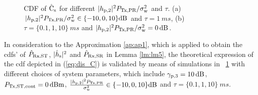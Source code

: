 \begin{figure}[!ht]
{\label{fig:CDF_C1_s}}
\hfil
{}
\vspace{0.3cm}
\caption{CDF of $\hat{\text{{C}}}_{\text{s}}$ for different $|h_{\text{p,2}}|^2 P_{\text{Tx,PR}}/\sigma^2_{\text{w}}$ and $\tau$. (a) $|h_{\text{p,2}}|^2 P_{\text{Tx,PR}}/\sigma^2_{\text{w}} \in \{-10, 0, 10\} \SI{}{dB}$ and $\tau = \SI{1}{ms}$, (b) $\tau = \{0.1, 1, 10\} \SI{}{ms}$ and $|h_{\text{p,2}}|^2 P_{\text{Tx,PR}}/\sigma^2_{\text{w}} = \SI{0}{dB}$.}%
\label{fig:CDF_eca}
\vspace{-0.5cm}
\end{figure}
In consideration to the Approximation \ref{ap:ap1}, which is applied to obtain the cdfs' of $\hat{P}_{\text{Rx,ST}}$, $|\hat{h}_{\text{s}}|^2$ and $\hat{P}_{\text{Rx,SR}}$ in Lemma \ref{lm:lm5}, the theoretical expression of the cdf depicted in (\ref{eq:dis_C}) is validated by means of simulations in \figurename~\ref{fig:CDF_eca} with different choices of system parameters, which include ${\gamma}_{\text{p,3}} = \SI{10}{dB}$, $P_{\text{Tx,ST,cont}} = \SI{0}{dBm}$, $\frac{|h_{\text{p,2}}|^2 P_{\text{Tx,PR}}}{\sigma^2_{\text{w}}} \in \{-10, 0, 10\} \SI{}{dB}$ and $\tau = \{0.1, 1, 10\} \SI{}{ms}$.

